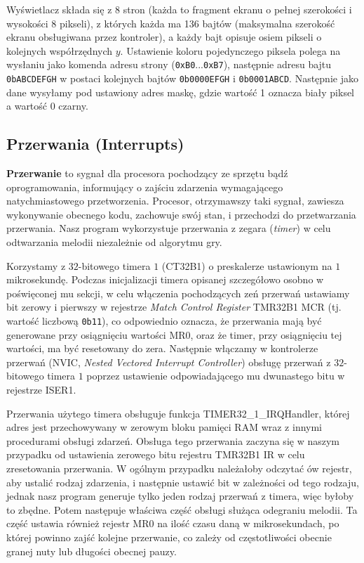 \documentclass[a4paper,12pt,twoside]{article}
\theoremstyle{plain}
\theoremstyle{definition}
\theoremstyle{remark}
\begin{document}
Wyświetlacz składa się z 8 stron (każda to fragment ekranu o pełnej szerokości i wysokości 8 pikseli), 
z których każda ma 136 bajtów (maksymalna szerokość ekranu obsługiwana przez kontroler), a każdy bajt opisuje 
osiem pikseli o kolejnych współrzędnych $y$.
Ustawienie koloru pojedynczego piksela polega na wysłaniu jako komenda adresu strony (\verb|0xB0|...\verb|0xB7|), 
następnie adresu bajtu \verb|0bABCDEFGH| w postaci kolejnych bajtów 
\verb|0b0000EFGH| i \verb|0b0001ABCD|. Następnie jako dane wysyłamy pod ustawiony adres maskę, gdzie wartość 1 oznacza biały piksel a wartość 0 czarny.

\subsection{Przerwania (Interrupts)}

\textbf{Przerwanie} to sygnał dla procesora pochodzący ze sprzętu bądź oprogramowania, informujący o zajściu zdarzenia wymagającego natychmiastowego przetworzenia. Procesor, otrzymawszy taki sygnał, zawiesza wykonywanie obecnego kodu, zachowuje swój stan, i przechodzi do przetwarzania przerwania. Nasz program wykorzystuje przerwania z zegara (\textit{timer}) w celu odtwarzania melodii niezależnie od algorytmu gry.

Korzystamy z $32$-bitowego timera $1$ (CT32B1) o preskalerze ustawionym na $1$ mikrosekundę. Podczas inicjalizacji timera opisanej szczegółowo osobno w poświęconej mu sekcji, w celu włączenia pochodzących zeń przerwań ustawiamy bit zerowy i pierwszy w rejestrze \textit{Match Control Register} TMR32B1 MCR (tj. wartość liczbową \verb|0b11|), co odpowiednio oznacza, że przerwania mają być generowane przy osiągnięciu wartości MR0, oraz że timer, przy osiągnięciu tej wartości, ma być resetowany do zera. Następnie włączamy w kontrolerze przerwań (NVIC, \textit{Nested Vectored Interrupt Controller}) obsługę przerwań z $32$-bitowego timera $1$ poprzez ustawienie odpowiadającego mu dwunastego bitu w rejestrze ISER1.

Przerwania użytego timera obsługuje funkcja \mbox{TIMER32\_1\_IRQHandler}, której adres jest przechowywany w zerowym bloku pamięci RAM wraz z innymi procedurami obsługi zdarzeń. Obsługa tego przerwania zaczyna się w naszym przypadku od ustawienia zerowego bitu rejestru TMR32B1 IR w celu zresetowania przerwania. W ogólnym przypadku należałoby odczytać ów rejestr, aby ustalić rodzaj zdarzenia, i następnie ustawić bit w zależności od tego rodzaju, jednak nasz program generuje tylko jeden rodzaj przerwań z timera, więc byłoby to zbędne. Potem następuje właściwa część obsługi służąca odegraniu melodii. Ta część ustawia również rejestr MR0 na ilość czasu daną w mikrosekundach, po której powinno zajść kolejne przerwanie, co zależy od częstotliwości obecnie granej nuty lub długości obecnej pauzy.
\end{document}
